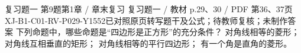 \par\noindent\begin{minipage}{\linewidth}
\begin{bankitem}{复习题一 第9题}{第1章 / 章末复习 复习题一 / 教材 p.29、30 / PDF 第36、37页}{XJ-B1-C01-RV-P029-Y1552}{已对照原页转写题干及公式；待教师复核；未制作答案}
下列命题中，哪些命题是“四边形是正方形”的充分条件？
对角线相等的菱形；
对角线互相垂直的矩形；
对角线相等的平行四边形；
有一个角是直角的菱形。
\end{bankitem}
\end{minipage}\par\medskip
